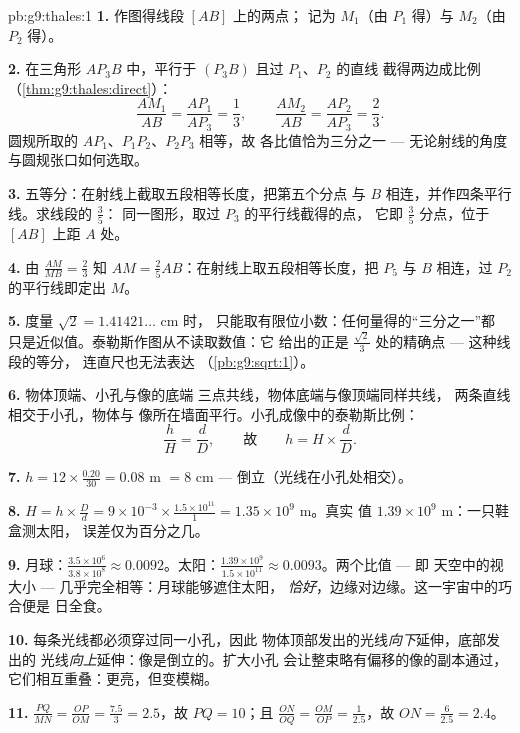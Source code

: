 \begin{solution}{pb:g9:thales:1}
\textbf{1.} 作图得线段 $[AB]$ 上的两点；
记为 $M_1$（由 $P_1$ 得）与 $M_2$（由 $P_2$ 得）。

\textbf{2.} 在三角形 $A P_3 B$ 中，平行于 $(P_3 B)$ 且过 $P_1$、$P_2$ 的直线
截得两边成比例
（\cref{thm:g9:thales:direct}）：
\[
\frac{A M_1}{AB} = \frac{A P_1}{A P_3} = \frac13,
\qquad
\frac{A M_2}{AB} = \frac{A P_2}{A P_3} = \frac23 .
\]
圆规所取的 $A P_1$、$P_1 P_2$、$P_2 P_3$ 相等，故
各比值恰为三分之一 --- 无论射线的角度
与圆规张口如何选取。

\textbf{3.} 五等分：在射线上截取五段相等长度，把第五个分点
与 $B$ 相连，并作四条平行线。求线段的 $\frac35$：
同一图形，取过 $P_3$ 的平行线截得的点，
它即 $\frac{3}{5}$ 分点，位于 $[AB]$ 上距 $A$ 处。

\textbf{4.} 由 $\frac{AM}{MB} = \frac23$ 知
$AM = \frac25 AB$：在射线上取五段相等长度，把 $P_5$ 与
$B$ 相连，过 $P_2$ 的平行线即定出 $M$。

\textbf{5.} 度量 $\sqrt2 = 1.41421\ldots$ cm 时，
只能取有限位小数：任何量得的“三分之一”都
只是近似值。泰勒斯作图从不读取数值：它
给出的正是 $\frac{\sqrt2}{3}$ 处的精确点 --- 这种线段的等分，
连直尺也无法表达
（\cref{pb:g9:sqrt:1}）。

\textbf{6.} 物体顶端、小孔与像的底端
三点共线，物体底端与像顶端同样共线，
两条直线相交于小孔，物体与
像所在墙面平行。小孔成像中的泰勒斯比例：
\[
\frac{h}{H} = \frac{d}{D},
\qquad\text{故}\qquad
h = H \times \frac dD .
\]

\textbf{7.} $h = 12 \times \frac{0.20}{30} = 0.08$ m $= 8$ cm
--- 倒立（光线在小孔处相交）。

\textbf{8.} $H = h \times \frac Dd = 9 \times 10^{-3} \times
\frac{1.5 \times 10^{11}}{1} = 1.35 \times 10^{9}$ m。真实
值 $1.39 \times 10^9$ m：一只鞋盒测太阳，
误差仅为百分之几。

\textbf{9.} 月球：$\frac{3.5 \times 10^6}{3.8 \times 10^8}
\approx 0.0092$。太阳：$\frac{1.39 \times 10^9}{1.5 \times
10^{11}} \approx 0.0093$。两个比值 --- 即
天空中的视大小 --- 几乎完全相等：月球能够遮住太阳，
\emph{恰好}，边缘对边缘。这一宇宙中的巧合便是
日全食。

\textbf{10.} 每条光线都必须穿过同一小孔，因此
物体顶部发出的光线\emph{向下}延伸，底部发出的
光线\emph{向上}延伸：像是倒立的。扩大小孔
会让整束略有偏移的像的副本通过，
它们相互重叠：更亮，但变模糊。

\textbf{11.} $\frac{PQ}{MN} = \frac{OP}{OM} = \frac{7.5}{3}
= 2.5$，故 $PQ = 10$；且 $\frac{ON}{OQ} = \frac{OM}{OP} =
\frac{1}{2.5}$，故 $ON = \frac{6}{2.5} = 2.4$。


\end{solution}
